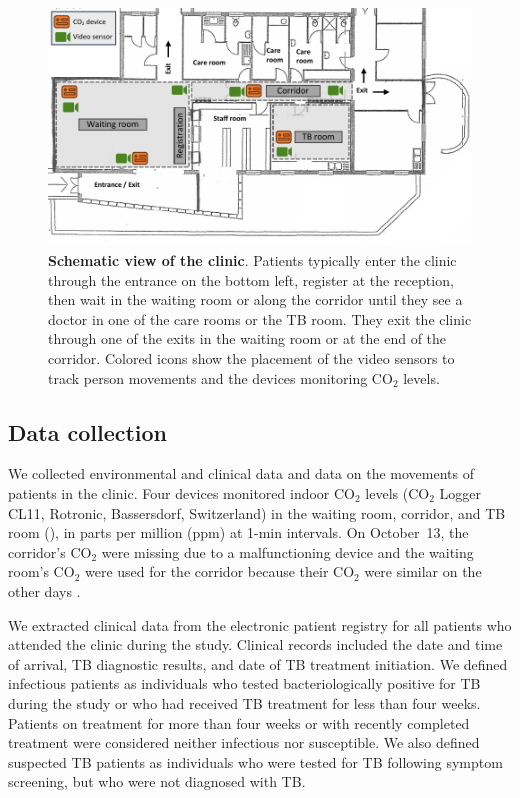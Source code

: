 \documentclass[fleqn,11pt]{wlscirep}
\begin{document}
\begin{figure}[!htpb]
    \centering
    \includegraphics{doc/clinic-schematic-annotated-view.pdf}
    \caption{\textbf{Schematic view of the clinic}. Patients typically enter the clinic through the entrance on the bottom left, register at the reception, then wait in the waiting room or along the corridor until they see a doctor in one of the care rooms or the TB room. They exit the clinic through one of the exits in the waiting room or at the end of the corridor. Colored icons show the placement of the video sensors to track person movements and the devices monitoring CO$_2$ levels.}
    \label{fig:floor-plan}
\end{figure}


\subsection*{Data collection}

We collected environmental and clinical data and data on the movements of patients in the clinic. Four devices monitored indoor CO$_2$ levels (CO$_2$ Logger CL11, Rotronic, Bassersdorf, Switzerland) in the waiting room, corridor, and TB room (), in parts per million (ppm) at 1-min intervals. On October~13, the corridor's CO$_2$  were missing due to a malfunctioning device and the waiting room's CO$_2$  were used for the corridor because their CO$_2$  were similar on the other days .

We extracted clinical data from the electronic patient registry for all patients who attended the clinic during the study. Clinical records included the date and time of arrival, TB diagnostic results, and date of TB treatment initiation. We defined infectious patients as individuals who tested bacteriologically positive for TB during the study or who had received TB treatment for less than four weeks. Patients on treatment for more than four weeks or with recently completed treatment were considered neither infectious nor susceptible. We also defined suspected TB patients as individuals who were tested for TB following symptom screening, but who were not diagnosed with TB. 
\end{document}
